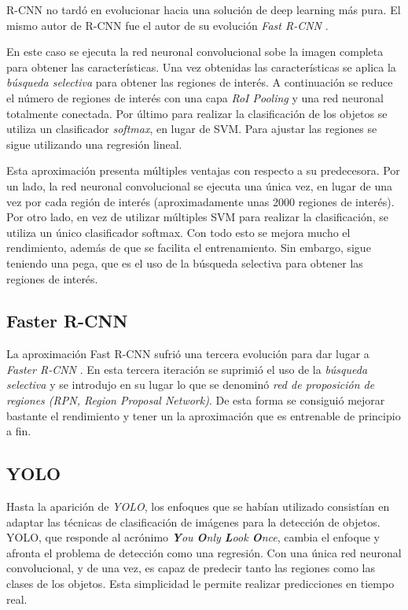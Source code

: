 R-CNN no tardó en evolucionar hacia una solución de deep learning más pura. El mismo autor de R-CNN fue el autor de su evolución \textit{Fast R-CNN} \cite{s2_stateofart_fastrcnn}.

En este caso se ejecuta la red neuronal convolucional sobe la imagen completa para obtener las características. Una vez obtenidas las características se aplica la \textit{búsqueda selectiva} para obtener las regiones de interés. A continuación se reduce el número de regiones de interés con una capa \textit{RoI Pooling} y una red neuronal totalmente conectada. Por último para realizar la clasificación de los objetos se utiliza un clasificador \textit{softmax}, en lugar de SVM. Para ajustar las regiones se sigue utilizando una regresión lineal.

Esta aproximación presenta múltiples ventajas con respecto a su predecesora. Por un lado, la red neuronal convolucional se ejecuta una única vez, en lugar de una vez por cada región de interés (aproximadamente unas 2000 regiones de interés). Por otro lado, en vez de utilizar múltiples SVM para realizar la clasificación, se utiliza un único clasificador softmax. Con todo esto se mejora mucho el rendimiento, además de que se facilita el entrenamiento. Sin embargo, sigue teniendo una pega, que es el uso de la búsqueda selectiva para obtener las regiones de interés.

\subsection*{Faster R-CNN}

La aproximación Fast R-CNN sufrió una tercera evolución para dar lugar a \textit{Faster R-CNN} \cite{s2_stateofart_fasterrcnn}. En esta tercera iteración se suprimió el uso de la \textit{búsqueda selectiva} y se introdujo en su lugar lo que se denominó \textit{red de proposición de regiones (RPN, Region Proposal Network)}. De esta forma se consiguió mejorar bastante el rendimiento y tener un la aproximación que es entrenable de principio a fin.

\subsection*{YOLO}

Hasta la aparición de \textit{YOLO}, los enfoques que se habían utilizado consistían en adaptar las técnicas de clasificación de imágenes para la detección de objetos. YOLO, que responde al acrónimo \textit{\textbf{Y}ou \textbf{O}nly \textbf{L}ook \textbf{O}nce}, cambia el enfoque y afronta el problema de detección como una regresión. Con una única red neuronal convolucional, y de una vez, es capaz de predecir tanto las regiones como las clases de los objetos. Esta simplicidad le permite realizar predicciones en tiempo real.

